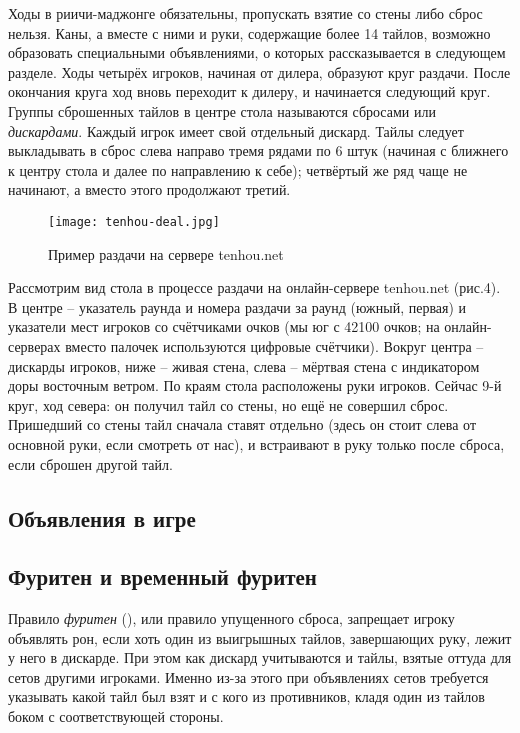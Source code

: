 Ходы в риичи-маджонге обязательны, пропускать взятие со стены либо сброс нельзя. Каны, а вместе с ними и руки, содержащие более 14 тайлов, возможно образовать специальными объявлениями, о которых рассказывается в следующем разделе. Ходы четырёх игроков, начиная от дилера, образуют круг раздачи. После окончания круга ход вновь переходит к дилеру, и начинается следующий круг. Группы сброшенных тайлов в центре стола называются сбросами или \textit{дискардами}. Каждый игрок имеет свой отдельный дискард. Тайлы следует выкладывать в сброс слева направо тремя рядами по 6 штук (начиная с ближнего к центру стола и далее по направлению к себе); четвёртый же ряд чаще не начинают, а вместо этого продолжают третий.

\begin{figure}[H]
	\centering
	\texttt{[image: tenhou-deal.jpg]}
	\caption{Пример раздачи на сервере tenhou.net}
\end{figure}

Рассмотрим вид стола в процессе раздачи на онлайн-сервере tenhou.net (рис.4). В центре – указатель раунда и номера раздачи за раунд (южный, первая) и указатели мест игроков со счётчиками очков (мы юг с 42100 очков; на онлайн-серверах вместо палочек используются цифровые счётчики). Вокруг центра – дискарды игроков, ниже – живая стена, слева – мёртвая стена с индикатором доры восточным ветром. По краям стола расположены руки игроков. Сейчас 9-й круг, ход севера: он получил тайл со стены, но ещё не совершил сброс. Пришедший со стены тайл сначала ставят отдельно (здесь он стоит слева от основной руки, если смотреть от нас), и встраивают в руку только после сброса, если сброшен другой тайл.

\subsection{Объявления в игре}


\subsection{Фуритен и временный фуритен}

Правило \textit{фуритен} (), или правило упущенного сброса, запрещает игроку объявлять рон, если хоть один из выигрышных тайлов, завершающих руку, лежит у него в дискарде. При этом как дискард учитываются и тайлы, взятые оттуда для сетов другими игроками. Именно из-за этого при объявлениях сетов требуется указывать какой тайл был взят и с кого из противников, кладя один из тайлов боком с соответствующей стороны.

